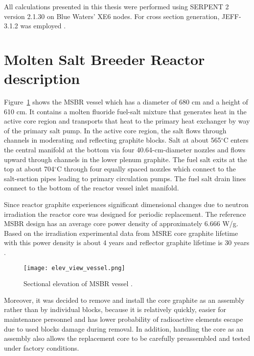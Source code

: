 All calculations presented in this thesis were performed using SERPENT 2 version 2.1.30 on Blue Waters’ XE6 nodes. For cross section generation, JEFF-3.1.2 was employed \cite{oecd/nea_data_bank_jeff-3.1.2_2014}. 

\section{Molten Salt Breeder Reactor description}

Figure~\ref{fig:ref_sect_msbr} shows the \gls{MSBR} vessel which has a diameter of 680 cm and a height of 610 cm. It contains a molten fluoride fuel-salt mixture that generates heat in the active core region and transports that heat to the primary heat exchanger by way of the primary salt pump. In the active core region, the salt flows through channels in moderating and reflecting graphite blocks. Salt at about 565$^{\circ}$C enters the central manifold at the bottom via four 40.64-cm-diameter nozzles and flows upward through channels in the lower plenum graphite. The fuel salt exits at the top at about 704$^{\circ}$C through four equally spaced nozzles which connect to the salt-suction pipes leading to primary circulation pumps. The fuel salt drain lines connect to the bottom of the reactor vessel inlet manifold.

Since reactor graphite experiences significant dimensional changes due to neutron irradiation the reactor core was designed for periodic replacement. The reference \gls{MSBR} design has an average core power density of approximately 6.666 W/g. Based on the irradiation experimental data from \gls{MSRE} core graphite lifetime with this power density is about 4 years and reflector graphite lifetime is 30 years \cite{robertson_conceptual_1971}.

\begin{figure}[htp!] %
  \centering
  \vspace{-0.3em}
  \texttt{[image: elev\_view\_vessel.png]}
  \caption{Sectional elevation of \gls{MSBR} vessel \cite{robertson_conceptual_1971}.}
  \vspace{-0.6em}
  \label{fig:ref_sect_msbr}
\end{figure}

Moreover, it was decided to remove and install the core graphite as an assembly rather than by individual blocks, because it is relatively quickly, easier for maintenance personnel and has lower probability of radioactive elements escape due to used blocks damage during removal. In addition, handling the core as an assembly also allows the replacement core to be carefully preassembled and tested under factory conditions.

